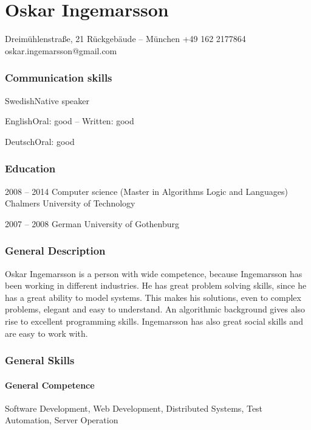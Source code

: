 \documentclass[fontsize=10pt]{tccv}
\begin{document}
\part{Oskar Ingemarsson}

\personal
    {Dreimühlenstra{\ss}e, 21 Rückgebäude -- München}
    {+49 162 2177864}
    {oskar.ingemarsson@gmail.com}

\section{Communication skills}

\begin{factlist}
\item{Swedish}{Native speaker}
\item{English}{Oral: good -- Written: good}
\item{Deutsch}{Oral: good}
\end{factlist}

\section{Education}

\begin{yearlist}
\item{2008 -- 2014}
     {Computer science (Master in Algorithms Logic and Languages)}
     {Chalmers University of Technology}
\item{2007 -- 2008}
    {German}
    {University of Gothenburg}
\end{yearlist}

\section{General Description}
Oskar Ingemarsson is a person with wide competence, because Ingemarsson has
been working in different industries. He has great problem solving skills,
since he has a great ability to model systems. This makes his solutions, even
to complex problems, elegant and easy to understand. An algorithmic background
gives also rise to excellent programming skills. Ingemarsson has also great
social skills and are easy to work with.


\section{General Skills}

\subsection{General Competence}
Software Development,
Web Development,
Distributed Systems,
Test Automation,
Server Operation
\end{document}
